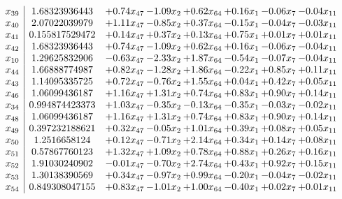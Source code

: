 \documentclass[8pt]{article}
\begin{document}
\[\begin{array}{c| c c@{\hskip 2pt} c@{\hskip 2pt} c@{\hskip 2pt} c@{\hskip 2pt} c@{\hskip 2pt} c@{\hskip 2pt} }
 x_{39}   &  1.68323936443 & +  0.74 x_{47} & -1.09 x_{2} & +  0.62 x_{64} & +  0.16 x_{1} & -0.06 x_{7} & -0.04 x_{11}\\
 x_{40}   &  2.07022039979 & +  1.11 x_{47} & -0.85 x_{2} & +  0.37 x_{64} & -0.15 x_{1} & -0.04 x_{7} & -0.03 x_{11}\\
 x_{41}   &  0.155817529472 & +  0.14 x_{47} & +  0.37 x_{2} & +  0.13 x_{64} & +  0.75 x_{1} & +  0.01 x_{7} & +  0.01 x_{11}\\
 x_{42}   &  1.68323936443 & +  0.74 x_{47} & -1.09 x_{2} & +  0.62 x_{64} & +  0.16 x_{1} & -0.06 x_{7} & -0.04 x_{11}\\
 x_{10}   &  1.29625832906 & -0.63 x_{47} & -2.33 x_{2} & +  1.87 x_{64} & -0.54 x_{1} & -0.07 x_{7} & -0.04 x_{11}\\
 x_{44}   &  1.66888774987 & +  0.82 x_{47} & -1.28 x_{2} & +  1.86 x_{64} & -0.22 x_{1} & +  0.85 x_{7} & +  0.11 x_{11}\\
 x_{43}   &  1.14095335725 & +  0.72 x_{47} & -0.76 x_{2} & +  1.55 x_{64} & +  0.04 x_{1} & +  0.42 x_{7} & +  0.05 x_{11}\\
 x_{46}   &  1.06099436187 & +  1.16 x_{47} & +  1.31 x_{2} & +  0.74 x_{64} & +  0.83 x_{1} & +  0.90 x_{7} & +  0.14 x_{11}\\
 x_{34}   &  0.994874423373 & +  1.03 x_{47} & -0.35 x_{2} & -0.13 x_{64} & -0.35 x_{1} & -0.03 x_{7} & -0.02 x_{11}\\
 x_{48}   &  1.06099436187 & +  1.16 x_{47} & +  1.31 x_{2} & +  0.74 x_{64} & +  0.83 x_{1} & +  0.90 x_{7} & +  0.14 x_{11}\\
 x_{49}   &  0.397232188621 & +  0.32 x_{47} & -0.05 x_{2} & +  1.01 x_{64} & +  0.39 x_{1} & +  0.08 x_{7} & +  0.05 x_{11}\\
 x_{50}   &  1.2516658124 & +  0.12 x_{47} & -0.71 x_{2} & +  2.14 x_{64} & +  0.34 x_{1} & +  0.14 x_{7} & +  0.08 x_{11}\\
 x_{51}   &  0.57867760123 & +  1.32 x_{47} & +  1.09 x_{2} & +  0.78 x_{64} & +  0.88 x_{1} & +  0.26 x_{7} & +  0.16 x_{11}\\
 x_{52}   &  1.91030240902 & -0.01 x_{47} & -0.70 x_{2} & +  2.74 x_{64} & +  0.43 x_{1} & +  0.92 x_{7} & +  0.15 x_{11}\\
 x_{53}   &  1.30138390569 & +  0.34 x_{47} & -0.97 x_{2} & +  0.99 x_{64} & -0.20 x_{1} & -0.04 x_{7} & -0.02 x_{11}\\
 x_{54}   &  0.849308047155 & +  0.83 x_{47} & -1.01 x_{2} & +  1.00 x_{64} & -0.40 x_{1} & +  0.02 x_{7} & +  0.01 x_{11}\\

\end{array}\]
\end{document}
